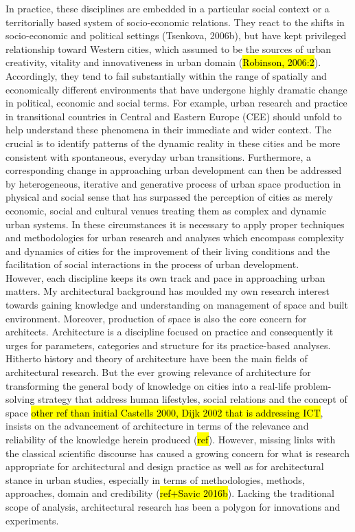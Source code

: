 \documentclass[11pt]{report}
\begin{document}
In practice, these disciplines are embedded in a particular social context or a territorially based system of socio-economic relations. They react to the shifts in socio-economic and political settings (Tsenkova, 2006b), but have kept privileged relationship toward Western cities, which assumed to be the sources of urban creativity, vitality and innovativeness in urban domain (\hl{Robinson, 2006:2}). Accordingly, they tend to fail substantially within the range of spatially and economically different environments that have undergone highly dramatic change in political, economic and social terms. For example, urban research and practice in transitional countries in Central and Eastern Europe (CEE) should unfold to help understand these phenomena in their immediate and wider context. The crucial is to identify patterns of the dynamic reality in these cities and be more consistent with spontaneous, everyday urban transitions. Furthermore, a corresponding change in approaching urban development can then be addressed by heterogeneous, iterative and generative process of urban space production in physical and social sense that has surpassed the perception of cities as merely economic, social and cultural venues treating them as complex and dynamic urban systems. In these circumstances it is necessary to apply proper techniques and methodologies for urban research and analyses which encompass complexity and dynamics of cities for the improvement of their living conditions and the facilitation of social interactions in the process of urban development.
\\
However, each discipline keeps its own track and pace in approaching urban matters. My architectural background has moulded my own research interest towards gaining knowledge and understanding on management of space and built environment. Moreover, production of space is also the core concern for architects. Architecture is a discipline focused on practice and consequently it urges for parameters, categories and structure for its practice-based analyses. Hitherto history and theory of architecture have been the main fields of architectural research. But the ever growing relevance of architecture for transforming the general body of knowledge on cities into a real-life problem-solving strategy that address human lifestyles, social relations and the concept of space \hl{other ref than initial Castells 2000, Dijk 2002 that is addressing ICT}, insists on the advancement of architecture in terms of the relevance and reliability of the knowledge herein produced (\hl{ref}). However, missing links with the classical scientific discourse has caused a growing concern for what is research appropriate for architectural and design practice as well as for architectural stance in urban studies, especially in terms of methodologies, methods, approaches, domain and credibility (\hl{ref+Savic 2016b}). Lacking the traditional scope of analysis, architectural research has been a polygon for innovations and experiments.
\end{document}
